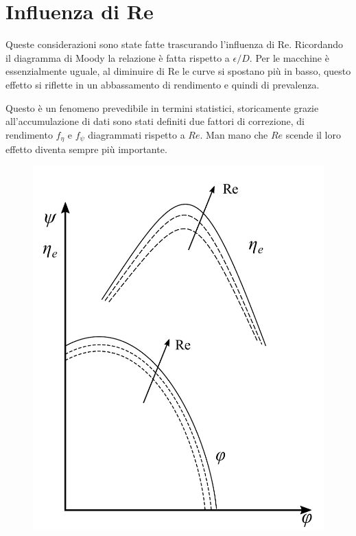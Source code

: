 \section{Influenza di Re}
Queste considerazioni sono state fatte trascurando l'influenza di Re. Ricordando il diagramma di Moody la relazione è fatta rispetto a $\epsilon/D$. Per le macchine è essenzialmente uguale, al diminuire di Re le curve si spostano più in basso, questo effetto si riflette in un abbassamento di rendimento e quindi di prevalenza.

Questo è un fenomeno prevedibile in termini statistici, storicamente grazie all'accumulazione di dati sono stati definiti due fattori di correzione, di rendimento $f_\eta$ e $f_\psi$ diagrammati rispetto a $Re$. Man mano che $Re$ scende il loro effetto diventa sempre più importante. 
\begin{figure}
\centering
\begin{minipage}{.4\textwidth}
  \centering
  \includegraphics[width=.95\linewidth]{fig/secondo_1.pdf}
  \label{fig:secondo_1}
\end{minipage}%
\begin{minipage}{.6\textwidth}

\end{minipage}
\end{figure}
